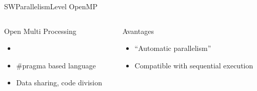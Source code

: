 %
\begin{Frame}{SWParallelismLevel OpenMP}
  \begin{columns}[t]
    \begin{column}{5cm} %
      \begin{block}{Open Multi Processing}
        \begin{itemize}
        \item {}
        \item \#pragma based language
        \item Data sharing, code division
        \end{itemize}
      \end{block} 
    \end{column}
    
    \begin{column}{5cm} %
      \begin{alertblock}{Avantages}
        \begin{itemize}
        \item ``Automatic parallelism''
        \item Compatible with sequential execution
        \end{itemize}
      \end{alertblock}   
    \end{column}
  \end{columns}  
\end{Frame}


